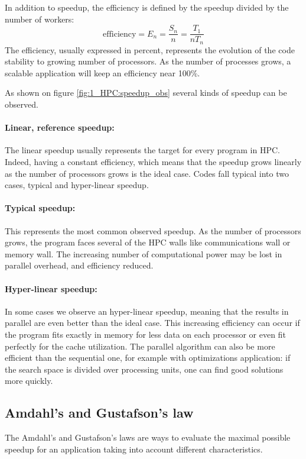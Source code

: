 In addition to speedup, the efficiency is defined by the speedup divided by the number of workers: 
\begin{equation}
\text{efficiency} = E_n = \frac{S_n}{n} = \frac{T_1}{nT_n}
\end{equation}
The efficiency, usually expressed in percent, represents the evolution of the code stability to growing number of processors. 
As the number of processes grows, a scalable application will keep an efficiency near 100\%.


As shown on figure \ref{fig:1_HPC:speedup_obs} several kinds of speedup can be observed. 
\paragraph{Linear, reference speedup: }
The linear speedup usually represents the target for every program in HPC. 
Indeed, having a constant efficiency, which means that the speedup grows linearly as the number of processors grows is the ideal case. 
Codes fall typical into two cases, typical and hyper-linear speedup. 
\paragraph{Typical speedup: }
This represents the most common observed speedup. 
As the number of processors grows, the program faces several of the HPC walls like communications wall or memory wall. 
The increasing number of computational power may be lost in parallel overhead, and efficiency reduced. 
\paragraph{Hyper-linear speedup: }
In some cases we observe an hyper-linear speedup, meaning that the results in parallel are even better than the ideal case. 
This increasing efficiency can occur if the program fits exactly in memory for less data on each processor or even fit perfectly for the cache utilization. 
The parallel algorithm can also be more efficient than the sequential one, for example with optimizations application: if the search space is divided over processing units, one can find good solutions more quickly.

\subsection{Amdahl's and Gustafson's law}
The Amdahl's and Gustafson's laws are ways to evaluate the maximal possible speedup for an application taking into account different characteristics. 

